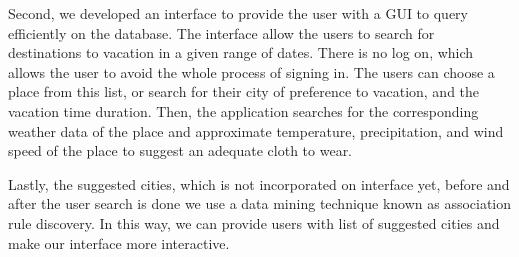 \documentclass{sig-alternate}
\begin{document}
	Second, we developed an interface to provide the user with a GUI to query efficiently on the 				database. The interface allow the users to search for destinations to vacation in a given range of 		dates. There is no log on, which allows the user to avoid the whole process of signing in. The users 	can choose a place from this list, or search for their city of preference to vacation, and the 			vacation time duration. Then, the application searches for the corresponding weather data of the 			place and approximate temperature, precipitation, and wind speed of the place to suggest an adequate 	cloth to wear. \newline

	Lastly, the suggested cities, which is not incorporated on interface yet, before and after the user 		search is done we use a data mining technique known as association rule discovery. In this way, we 		can provide users with list of suggested cities and make our interface more interactive.\newline
\end{document}
